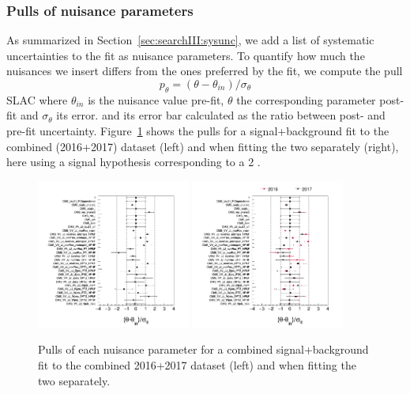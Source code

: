 \subsubsection{Pulls of nuisance parameters}
As summarized in Section~\ref{sec:searchIII:sysunc}, we add a list of systematic uncertainties to the fit as nuisance parameters.
To quantify how much the nuisances we insert differs from the ones preferred by the fit, we compute the pull
\begin{equation}
p_{\theta} = (\theta - \theta_{in})/\sigma_\theta
\end{equation}SLAC
where $\theta_{in}$ is the nuisance value pre-fit, $\theta$ the corresponding parameter post-fit and $\sigma_\theta$ its error.
and its error bar calculated as the ratio between post- and pre-fit uncertainty.
Figure~\ref{fig:searchIII:pullsCombo1617} shows the pulls for a signal+background fit to the combined (2016+2017) dataset (left) and when fitting the two separately (right), here using a signal hypothesis corresponding to a 2 \TeV \BulkG.
\begin{figure}[h!]
\centering
\includegraphics[width=0.45\textwidth]{figures/analysis/search3/AN-17-303/postfitchecks/pulls_Combo1617.png}
\includegraphics[width=0.45\textwidth]{figures/analysis/search3/AN-17-303/postfitchecks/pulls_16_vs_17.png}
\caption{Pulls of each nuisance parameter for a combined signal+background fit to the combined 2016+2017 dataset (left) and when fitting the two separately.}
\label{fig:searchIII:pullsCombo1617}
\end{figure}


